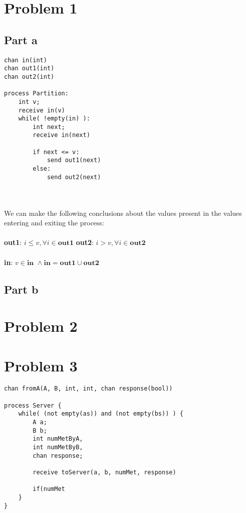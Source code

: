 \documentclass{article}%
\begin{document}
\section*{Problem 1}

\subsection*{Part a}

\lstset{language=Python}
\begin{lstlisting}[frame=single]
chan in(int)
chan out1(int)
chan out2(int)

process Partition:
    int v;
    receive in(v)
    while( !empty(in) ):
        int next;
        receive in(next)

        if next <= v:
            send out1(next)
        else:
            send out2(next)
\end{lstlisting}\\
\\[0.1in]
We can make the following conclusions about the values present in the values entering and exiting the process:\\
\\
\textbf{out1}: $i \leq v, \forall i \in \textbf{out1}$
\hfill
\textbf{out2}: $i > v, \forall i \in \textbf{out2}$\\
\\
\textbf{in}: $v \in \textbf{in } \wedge \textbf{in} = \textbf{out1} \cup \textbf{out2}$

\subsection*{Part b}

\section*{Problem 2}
\section*{Problem 3}

\lstset{language=Python}
\begin{lstlisting}[frame=single]
chan fromA(A, B, int, int, chan response(bool))

process Server {
    while( (not empty(as)) and (not empty(bs)) ) {
        A a;
        B b;
        int numMetByA,
        int numMetByB,
        chan response;

        receive toServer(a, b, numMet, response)

        if(numMet
    }
}

\end{lstlisting}
\end{document}
